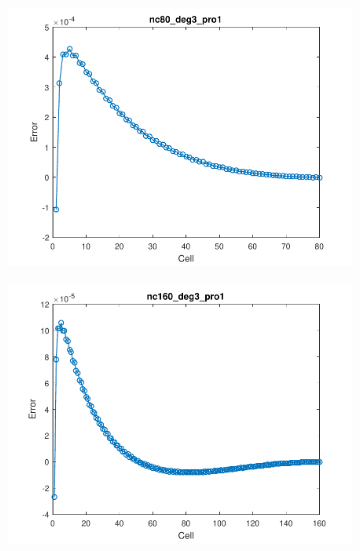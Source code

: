 \documentclass[11pt,a4paper]{article}
\theoremstyle{plain}
\theoremstyle{definition}
\begin{document}
\begin{figure}[H]
\medskip
\begin{subfigure}[b]{0.48\textwidth}
\includegraphics[width=\linewidth]{../../tests_01_01/test_01_01_test48_pro1/output/plots/nc80_deg3_wei111_pro1.pdf}
\end{subfigure}\hspace*{\fill}
\begin{subfigure}[b]{0.48\textwidth}
\includegraphics[width=\linewidth]{../../tests_01_01/test_01_01_test48_pro1/output/plots/nc160_deg3_wei111_pro1.pdf}
\end{subfigure}


\end{figure}
\end{document}
